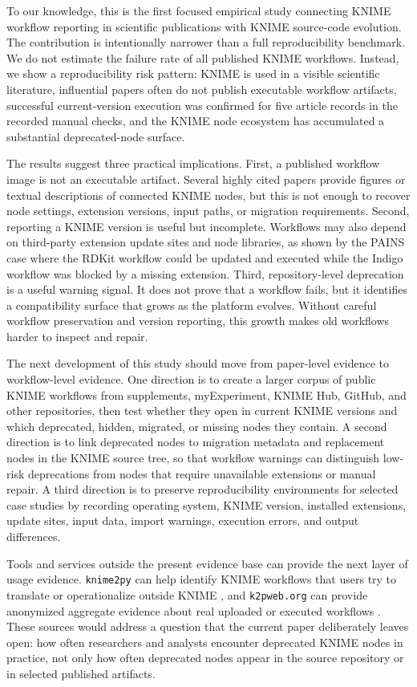 \documentclass[runningheads]{llncs}
\begin{document}
To our knowledge, this is the first focused empirical study connecting KNIME
workflow reporting in scientific publications with KNIME source-code evolution.
The contribution is intentionally narrower than a full reproducibility
benchmark. We do not estimate the failure rate of all published KNIME
workflows. Instead, we show a reproducibility risk pattern: KNIME is used in a
visible scientific literature, influential papers often do not publish
executable workflow artifacts, successful current-version execution was
confirmed for five article records in the recorded manual checks, and the
KNIME node ecosystem has accumulated a substantial deprecated-node surface.

The results suggest three practical implications. First, a published workflow
image is not an executable artifact. Several highly cited papers provide
figures or textual descriptions of connected KNIME nodes, but this is not
enough to recover node settings, extension versions, input paths, or migration
requirements. Second, reporting a KNIME version is useful but incomplete.
Workflows may also depend on third-party extension update sites and node
libraries, as shown by the PAINS case where the RDKit workflow could be
updated and executed while the Indigo workflow was blocked by a missing
extension. Third, repository-level deprecation is a useful warning signal. It
does not prove that a workflow fails, but it identifies a compatibility surface
that grows as the platform evolves. Without careful workflow preservation and
version reporting, this growth makes old workflows harder to inspect and
repair.

The next development of this study should move from paper-level evidence to
workflow-level evidence. One direction is to create a larger corpus of public
KNIME workflows from supplements, myExperiment, KNIME Hub, GitHub, and other
repositories, then test whether they open in current KNIME versions and which
deprecated, hidden, migrated, or missing nodes they contain. A second direction
is to link deprecated nodes to migration metadata and replacement nodes in the
KNIME source tree, so that workflow warnings can distinguish low-risk
deprecations from nodes that require unavailable extensions or manual repair.
A third direction is to preserve reproducibility environments for selected
case studies by recording operating system, KNIME version, installed
extensions, update sites, input data, import warnings, execution errors, and
output differences.

Tools and services outside the present evidence base can provide the next
layer of usage evidence. \texttt{knime2py} can help identify KNIME workflows that users
try to translate or operationalize outside KNIME \cite{KaplanKnime2py2026},
and \texttt{k2pweb.org} can provide anonymized aggregate evidence about real uploaded
or executed workflows \cite{K2PWeb2026}. These
sources would address a question that the current paper deliberately leaves
open: how often researchers and analysts encounter deprecated KNIME nodes in
practice, not only how often deprecated nodes appear in the source repository
or in selected published artifacts.



\end{document}
